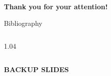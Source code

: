 \documentclass{beamer}
\begin{document}
\begin{frame} %
    \begin{center}
            \LARGE{\textbf{Thank you for your attention!}}
    \end{center}
\end{frame}
\begin{frame}{Bibliography} %
\begin{columns}
    \begin{column}{1.04\framewidth}
            \setlength{\leftmargini}{1.05em}
    
   {\footnotesize }
    \end{column}
\end{columns}

\end{frame}
\begin{frame} %
    \begin{center}
            \LARGE{\textbf{BACKUP SLIDES}}
    \end{center}
\end{frame}
\end{document}
